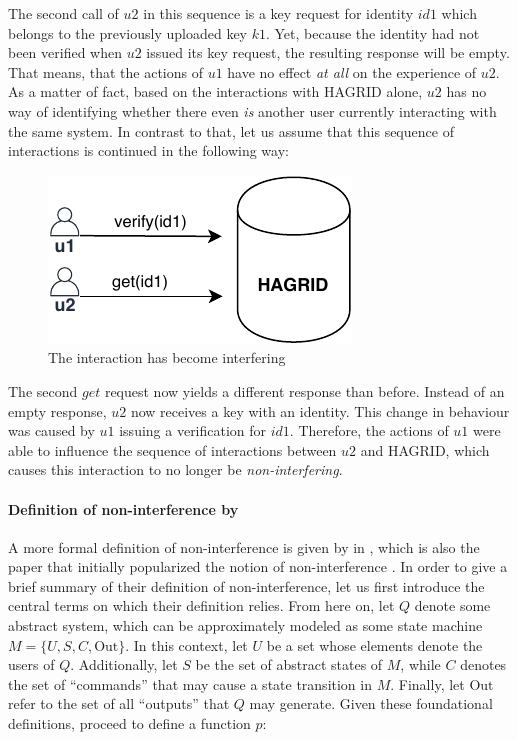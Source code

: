 The second call of \(u2\) in this sequence is a key request for identity \(id1\) which belongs to the previously uploaded key \(k1\). Yet, because the identity had not been verified when \(u2\) issued its key request, the resulting response will be empty. That means, that the actions of \(u1\) have no effect \emph{at all} on the experience of \(u2\). 
As a matter of fact, based on the interactions with HAGRID alone, \(u2\) has no way of identifying whether there even \emph{is} another user currently interacting with the same system. 
In contrast to that, let us assume that this sequence of interactions is continued in the following way: 
\begin{figure}[h]
    \label{fig:example}
    \centering
    \includegraphics{images/interfering.pdf}
    \caption{The interaction has become interfering}
\end{figure}

The second \(get\) request now yields a different response than before. Instead of an empty response, \(u2\) now receives a key with an identity. This change in behaviour was caused by \(u1\) issuing a verification for \(id1\). Therefore, the actions of \(u1\) were able to influence the sequence of interactions between \(u2\) and HAGRID, which causes this interaction to no longer be \emph{non-interfering}.

\paragraph{Definition of non-interference by \citeauthor{Goguen_Meseguer_82}}
A more formal definition of non-interference is given by \citeauthor{Goguen_Meseguer_82} in , which is also the paper that initially popularized the notion of non-interference \cite{Goguen_Meseguer_82}. 
In order to give a brief summary of their definition of non-interference, let us first introduce the central terms on which their definition relies. From here on, let \(Q\) denote some abstract system, which can be approximately modeled as some state machine \(M = \{U,S,C,\text{Out}\}\). 
In this context, let \(U\) be a set whose elements denote the users of \(Q\). Additionally, let \(S\) be the set of abstract states of \(M\), while \(C\) denotes the set of ``commands'' that may cause a state transition in \(M\). Finally, let \(\text{Out}\) refer to the set of all ``outputs'' that \(Q\) may generate. 
Given these foundational definitions, \citeauthor{Goguen_Meseguer_82} proceed to define a function \(p\): 

